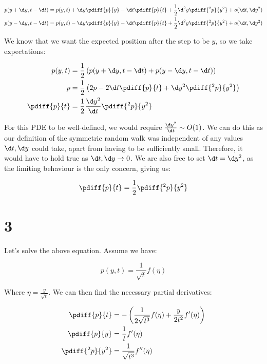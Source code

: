 \documentclass{article}
\begin{document}
	\begin{align*}
		p(y + \d y, t - \d t) &= p(y,t) + \d y \pdiff{p}{y} - \d t \pdiff{p}{t} + \frac{1}{2}\d^2 y \pdiff{^2p}{y^2} + o(\d t, \d y^2)\\
		p(y - \d y, t - \d t) &= p(y,t) - \d y \pdiff{p}{y} - \d t \pdiff{p}{t} + \frac{1}{2}\d^2 y \pdiff{^2p}{y^2} + o(\d t, \d y^2)
	\end{align*}
	
	We know that we want the expected position after the step to be $y$, so we take expectations:
	
	\begin{align*}
		p(y,t) &= \frac{1}{2}\left(p(y + \d y, t - \d t) + p(y - \d y, t - \d t) \right) \\
		p &= \frac{1}{2}\left(2p - 2 \d t \pdiff{p}{t} + \d y^2 \pdiff{^2 p}{y^2}\right) \\
		\pdiff{p}{t} &= \frac{1}{2} \frac{\d y^2}{\d t} \pdiff{^2 p}{y^2}
	\end{align*}
	
	For this PDE to be well-defined, we would require $\frac{\d y^2}{\d t} \sim O(1)$. We can do this as our definition of the symmetric random walk was independent of any values $\d t, \d y$ could take, apart from having to be sufficiently small. Therefore, it would have to hold true as $\d t, \d y \rightarrow 0$. We are also free to set $\d t = \d y^2$, as the limiting behaviour is the only concern, giving us:
	
	\begin{equation*}
		\pdiff{p}{t} = \frac{1}{2} \pdiff{^2 p}{y^2}
	\end{equation*}
	
	\section*{3}
	
	Let's solve the above equation. Assume we have:
	
	\begin{equation*}
		p(y,t) = \frac{1}{\sqrt{t}} f(\eta)
	\end{equation*}
	
	Where $\eta = \frac{y}{\sqrt{t}}$. We can then find the necessary partial derivatives:
	
	\begin{align*}
		\pdiff{p}{t} &= -\left(\frac{1}{2\sqrt{t^3}} f(\eta) + \frac{y}{2t^2} f'(\eta)\right) \\
		\pdiff{p}{y} &= \frac{1}{t}f'(\eta) \\
		\pdiff{^2p}{y^2} &= \frac{1}{\sqrt{t^3}}f''(\eta)
	\end{align*}
	
\end{document}
